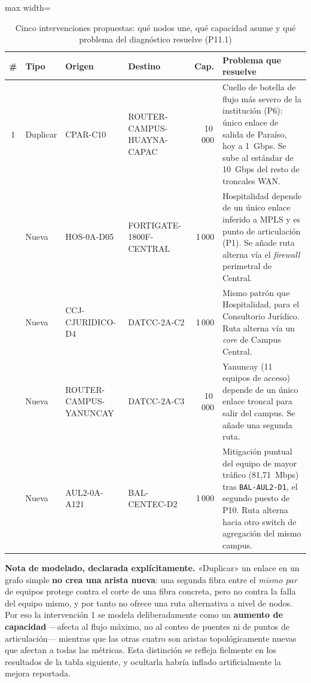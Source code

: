 \documentclass[10pt,a4paper]{extarticle}
\newcommand{\code}[1]{\texttt{\small #1}}
\begin{document}
\begin{table}[H]
\centering
\caption{Cinco intervenciones propuestas: qué nodos une, qué capacidad asume y qué problema del diagnóstico resuelve (P11.1)}
\label{tab:intervenciones}
\small
\begin{adjustbox}{max width=\textwidth}
\begin{tabular}{clp{2.9cm}p{2.9cm}rp{4.4cm}}
\toprule
\# & \textbf{Tipo} & \textbf{Origen} & \textbf{Destino} & \textbf{Cap.} & \textbf{Problema que resuelve} \\
\midrule
1 & Duplicar & CPAR-C10 & ROUTER-CAMPUS-HUAYNA-CAPAC & 10\,000 &
Cuello de botella de flujo más severo de la institución (P6): único enlace de salida de
Paraíso, hoy a 1~Gbps. Se sube al estándar de 10~Gbps del resto de troncales WAN. \\
\addlinespace
2 & Nueva & HOS-0A-D05 & FORTIGATE-1800F-CENTRAL & 1\,000 &
Hospitalidad depende de un único enlace inferido a MPLS y es punto de articulación (P1). Se
añade ruta alterna vía el \textit{firewall} perimetral de Central. \\
\addlinespace
3 & Nueva & CCJ-CJURIDICO-D4 & DATCC-2A-C2 & 1\,000 &
Mismo patrón que Hospitalidad, para el Consultorio Jurídico. Ruta alterna vía un
\textit{core} de Campus Central. \\
\addlinespace
4 & Nueva & ROUTER-CAMPUS-YANUNCAY & DATCC-2A-C3 & 10\,000 &
Yanuncay (11 equipos de acceso) depende de un único enlace troncal para salir del campus. Se
añade una segunda ruta. \\
\addlinespace
5 & Nueva & AUL2-0A-A121 & BAL-CENTEC-D2 & 1\,000 &
Mitigación puntual del equipo de mayor tráfico (81,71~Mbps) tras \code{BAL-AUL2-D1}, el
segundo puesto de P10. Ruta alterna hacia otro switch de agregación del mismo campus. \\
\bottomrule
\end{tabular}
\end{adjustbox}
\end{table}

\begin{clave}
\textbf{Nota de modelado, declarada explícitamente.} «Duplicar» un enlace en un grafo simple
\textbf{no crea una arista nueva}: una segunda fibra entre el \textit{mismo par} de equipos
protege contra el corte de una fibra concreta, pero no contra la falla del equipo mismo, y
por tanto no ofrece una ruta alternativa a nivel de nodos. Por eso la intervención 1 se
modela deliberadamente como un \textbf{aumento de capacidad} ---afecta al flujo máximo, no al
conteo de puentes ni de puntos de articulación--- mientras que las otras cuatro son aristas
topológicamente nuevas que afectan a todas las métricas. Esta distinción se refleja
fielmente en los resultados de la tabla siguiente, y ocultarla habría inflado artificialmente
la mejora reportada.
\end{clave}
\end{document}
